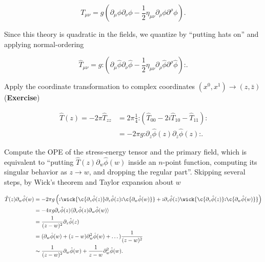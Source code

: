\begin{equation}
T_{\mu\nu} = g ( \partial_\mu \phi \partial_\nu \phi - \frac{1}{2} \eta_{\mu\nu} \partial_\rho \phi \partial^\rho \phi ).
\end{equation}

\noindent Since this theory is quadratic in the fields, we quantize by ``putting hats on'' and applying normal-ordering

\begin{equation}
\hat{T}_{\mu\nu} = g \textbf{:} ( \partial_\mu \hat{\phi} \partial_\nu \hat{\phi} - \frac{1}{2} \eta_{\mu\nu} \partial_\rho \hat{\phi} \partial^\rho \hat{\phi} ) \textbf{:} .
\end{equation}

\noindent Apply the coordinate transformation to complex coordinates $(x^0, x^1) \rightarrow (z, \bar{z})$ (\textbf{Exercise})

\begin{align}
\hat{T} (z) = -2 \pi \hat{T}_{zz} &= 2\pi \frac{1}{4} \textbf{:} (\hat{T}_{00} - 2i \hat{T}_{10} - \hat{T}_{11}) \textbf{:} \\
&= -2\pi g \textbf{:} \partial_z \hat{\phi} (z)  \partial_z \hat{\phi} (z)  \textbf{:}.
\end{align}

\noindent Compute the OPE of the stress-energy tensor and the primary field, which is equivalent to ``putting $\hat{T} (z) \partial_w \hat{\phi} (w)$ inside an $n$-point function, computing its singular behavior as $z \rightarrow w$, and dropping the regular part''. Skipping several steps, by Wick's theorem and Taylor expansion about $w$

\begin{align}
\hat{T} (z) \partial_w \hat{\phi} (w) &= -2\pi g \left( \textbf{:} \wick{ \c {\partial_z \hat{\phi} (z)} \partial_z \hat{\phi} (z) \textbf{:} \c{ \partial_w \hat{\phi} (w) }} + \textbf{:} \partial_z \hat{\phi} (z) \wick{ \c {\partial_z \hat{\phi} (z)} \textbf{:} \c {\partial_w \hat{\phi} (w)}} \right) \\
&= -4\pi g \partial_z \hat{\phi} (z) \langle \partial_z \hat{\phi} (z) \partial_w \hat{\phi} (w) \rangle \\
&= \frac{1}{(z-w)^2} \partial_z \hat{\phi} (z) \\
&= (\partial_w \hat{\phi} (w) + (z-w) \partial_w^2 \hat{\phi} (w) + \dots ) \frac{1}{(z-w)^2} \\
&\sim \frac{1}{(z-w)^2} \partial_w \hat{\phi} (w) + \frac{1}{z-w} \partial_w^2 \hat{\phi} (w).
\end{align}

